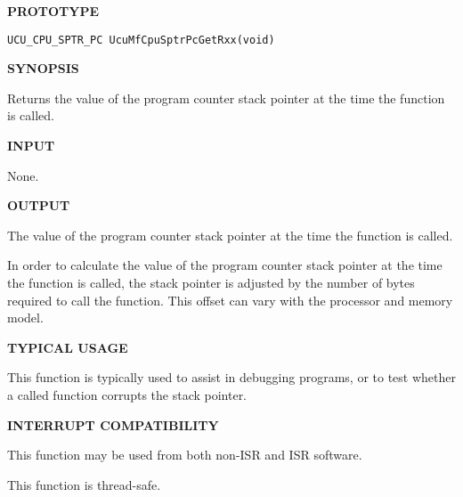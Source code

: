 \noindent\textbf{PROTOTYPE}
\begin {list}{}{\setlength{\leftmargin}{0.25in}\setlength{\topsep}{0.0in}}
\item
\begin{verbatim}
UCU_CPU_SPTR_PC UcuMfCpuSptrPcGetRxx(void)
\end{verbatim}
\end{list}
\vspace{2.8ex}

\noindent\textbf{SYNOPSIS}
\begin{list}{}{\setlength{\leftmargin}{0.25in}\setlength{\topsep}{0.0in}}
\item
Returns the value of the program counter stack pointer at the time 
the function is called.
\end{list}
\vspace{2.8ex}

\noindent\textbf{INPUT}
\begin{list}{}{\setlength{\leftmargin}{0.5in}\setlength{\itemindent}{-0.25in}\setlength{\topsep}{0.0in}\setlength{\partopsep}{0.0in}}
\item None.
\end{list}
\vspace{2.8ex}

\noindent\textbf{OUTPUT}
\begin{list}{}{\setlength{\leftmargin}{0.25in}\setlength{\topsep}{0.0in}}
\item The value of the program counter stack pointer at the time the
      function is called.
\item In order to calculate the value of the program counter stack pointer
      at the time the function is called,
      the stack pointer is adjusted by the number of bytes required
      to call the function.  This offset can vary with the processor and
      memory model.
\end{list}
\vspace{2.8ex}

\noindent\textbf{TYPICAL USAGE}
\begin{list}{}{\setlength{\leftmargin}{0.25in}\setlength{\topsep}{0.0in}}
\item This function is typically used to assist in debugging 
      programs, or to test whether a called function corrupts the stack pointer.
\end{list}
\vspace{2.8ex}

\noindent\textbf{INTERRUPT COMPATIBILITY}
\begin{list}{}{\setlength{\leftmargin}{0.25in}\setlength{\topsep}{0.0in}}
\item This function may be used from both non-ISR and ISR software.
\item This function is thread-safe.
\end{list}
\vspace{2.8ex}

